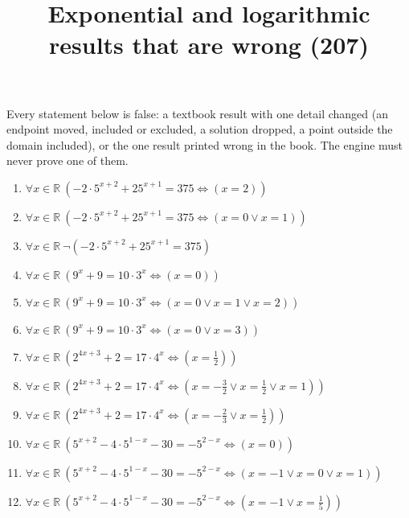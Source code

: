 \documentclass[11pt,a4paper]{article}
\title{Exponential and logarithmic results that are wrong (207)}
\author{}
\date{}
\begin{document}
\maketitle
Every statement below is false: a textbook result with one detail changed (an endpoint moved, included or excluded, a solution dropped, a point outside the domain included), or the one result printed wrong in the book. The engine must never prove one of them.

\begin{enumerate}
\item $\displaystyle \forall x \in \mathbb{R}\ \left( -2 \cdot 5^{x+2} + 25^{x+1} = 375 \iff \left( x = 2 \right) \right)$
\item $\displaystyle \forall x \in \mathbb{R}\ \left( -2 \cdot 5^{x+2} + 25^{x+1} = 375 \iff \left( x = 0 \lor x = 1 \right) \right)$
\item $\displaystyle \forall x \in \mathbb{R}\ \lnot \left( -2 \cdot 5^{x+2} + 25^{x+1} = 375 \right)$
\item $\displaystyle \forall x \in \mathbb{R}\ \left( 9^{x} + 9 = 10 \cdot 3^{x} \iff \left( x = 0 \right) \right)$
\item $\displaystyle \forall x \in \mathbb{R}\ \left( 9^{x} + 9 = 10 \cdot 3^{x} \iff \left( x = 0 \lor x = 1 \lor x = 2 \right) \right)$
\item $\displaystyle \forall x \in \mathbb{R}\ \left( 9^{x} + 9 = 10 \cdot 3^{x} \iff \left( x = 0 \lor x = 3 \right) \right)$
\item $\displaystyle \forall x \in \mathbb{R}\ \left( 2^{4x+3} + 2 = 17 \cdot 4^{x} \iff \left( x = \frac{1}{2} \right) \right)$
\item $\displaystyle \forall x \in \mathbb{R}\ \left( 2^{4x+3} + 2 = 17 \cdot 4^{x} \iff \left( x = -\frac{3}{2} \lor x = \frac{1}{2} \lor x = 1 \right) \right)$
\item $\displaystyle \forall x \in \mathbb{R}\ \left( 2^{4x+3} + 2 = 17 \cdot 4^{x} \iff \left( x = -\frac{2}{3} \lor x = \frac{1}{2} \right) \right)$
\item $\displaystyle \forall x \in \mathbb{R}\ \left( 5^{x+2} - 4 \cdot 5^{1-x} - 30 = -5^{2-x} \iff \left( x = 0 \right) \right)$
\item $\displaystyle \forall x \in \mathbb{R}\ \left( 5^{x+2} - 4 \cdot 5^{1-x} - 30 = -5^{2-x} \iff \left( x = -1 \lor x = 0 \lor x = 1 \right) \right)$
\item $\displaystyle \forall x \in \mathbb{R}\ \left( 5^{x+2} - 4 \cdot 5^{1-x} - 30 = -5^{2-x} \iff \left( x = -1 \lor x = \frac{1}{5} \right) \right)$

\end{enumerate}
\end{document}

